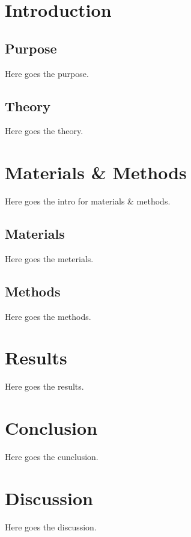 \documentclass[
]{article}
\begin{document}
{
\setcounter{tocdepth}{2}
\tableofcontents
}
\newpage


\hypertarget{introduction}{%
\section{Introduction}\label{introduction}}

\hypertarget{purpose}{%
\subsection{Purpose}\label{purpose}}

Here goes the purpose.

\hypertarget{theory}{%
\subsection{Theory}\label{theory}}

Here goes the theory.

\newpage

\hypertarget{materials-methods}{%
\section{Materials \& Methods}\label{materials-methods}}

Here goes the intro for materials \& methods.

\hypertarget{materials}{%
\subsection{Materials}\label{materials}}

Here goes the meterials.

\hypertarget{methods}{%
\subsection{Methods}\label{methods}}

Here goes the methods.

\newpage

\hypertarget{results}{%
\section{Results}\label{results}}

Here goes the results.

\newpage

\hypertarget{conclusion}{%
\section{Conclusion}\label{conclusion}}

Here goes the cunclusion.

\newpage

\hypertarget{discussion}{%
\section{Discussion}\label{discussion}}

Here goes the discussion.

\newpage
\end{document}
